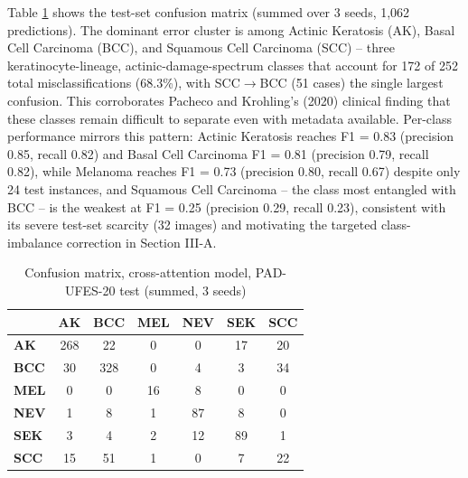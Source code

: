 \documentclass[conference]{IEEEtran}
\begin{document}
Table \ref{tab:confmat} shows the test-set confusion matrix (summed over 3 seeds, 1,062 predictions). The dominant error cluster is among Actinic Keratosis (AK), Basal Cell Carcinoma (BCC), and Squamous Cell Carcinoma (SCC) -- three keratinocyte-lineage, actinic-damage-spectrum classes that account for 172 of 252 total misclassifications (68.3\%), with SCC$\to$BCC (51 cases) the single largest confusion. This corroborates Pacheco and Krohling's (2020) clinical finding that these classes remain difficult to separate even with metadata available. Per-class performance mirrors this pattern: Actinic Keratosis reaches F1 = 0.83 (precision 0.85, recall 0.82) and Basal Cell Carcinoma F1 = 0.81 (precision 0.79, recall 0.82), while Melanoma reaches F1 = 0.73 (precision 0.80, recall 0.67) despite only 24 test instances, and Squamous Cell Carcinoma -- the class most entangled with BCC -- is the weakest at F1 = 0.25 (precision 0.29, recall 0.23), consistent with its severe test-set scarcity (32 images) and motivating the targeted class-imbalance correction in Section III-A.

\begin{table}[t]
\caption{Confusion matrix, cross-attention model, PAD-UFES-20 test (summed, 3 seeds)}
\label{tab:confmat}
\centering
\scriptsize
\begin{tabular}{|l|c|c|c|c|c|c|}
\hline
& \textbf{AK} & \textbf{BCC} & \textbf{MEL} & \textbf{NEV} & \textbf{SEK} & \textbf{SCC} \\
\hline
\textbf{AK} & \cellcolor{diagcolor!60}268 & \cellcolor{offdiagcolor!14}22 & 0 & 0 & \cellcolor{offdiagcolor!13}17 & \cellcolor{offdiagcolor!13}20 \\
\hline
\textbf{BCC} & \cellcolor{offdiagcolor!15}30 & \cellcolor{diagcolor!70}328 & 0 & \cellcolor{offdiagcolor!11}4 & \cellcolor{offdiagcolor!10}3 & \cellcolor{offdiagcolor!16}34 \\
\hline
\textbf{MEL} & 0 & 0 & \cellcolor{diagcolor!18}16 & \cellcolor{offdiagcolor!11}8 & 0 & 0 \\
\hline
\textbf{NEV} & \cellcolor{offdiagcolor!10}1 & \cellcolor{offdiagcolor!11}8 & \cellcolor{offdiagcolor!10}1 & \cellcolor{diagcolor!29}87 & \cellcolor{offdiagcolor!11}8 & 0 \\
\hline
\textbf{SEK} & \cellcolor{offdiagcolor!10}3 & \cellcolor{offdiagcolor!11}4 & \cellcolor{offdiagcolor!10}2 & \cellcolor{offdiagcolor!12}12 & \cellcolor{diagcolor!30}89 & \cellcolor{offdiagcolor!10}1 \\
\hline
\textbf{SCC} & \cellcolor{offdiagcolor!12}15 & \cellcolor{offdiagcolor!18}51 & \cellcolor{offdiagcolor!10}1 & 0 & \cellcolor{offdiagcolor!11}7 & \cellcolor{diagcolor!19}22 \\
\hline
\end{tabular}
\end{table}
\end{document}

